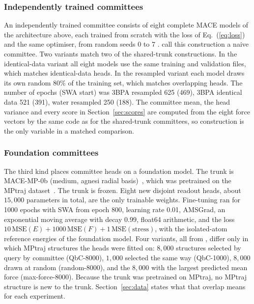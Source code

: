 \subsubsection{Independently trained committees}

An independently trained committee consists of eight complete MACE models of
the architecture above, each trained from scratch with the loss of
Eq.~(\ref{eq:loss}) and the same optimiser, from random seeds 0 to 7
\citep{krogh1995neural,lakshminarayanan2017simple}.
\citet{beck2025committee} call this construction a naive committee. Two
variants match two of the shared-trunk constructions. In the identical-data
variant all eight models use the same training and validation files, which
matches identical-data heads. In the resampled variant each model draws its
own random 80\% of the training set, which matches overlapping heads. The
number of epochs (SWA start) was 3BPA resampled 625 (469), 3BPA identical data
521 (391), water resampled 250 (188). The committee mean, the head variance and
every score in Section~\ref{sec:scores} are computed from the eight force
vectors by the same code as for the shared-trunk committees, so construction
is the only variable in a matched comparison.

\subsubsection{Foundation committees}

The third kind places committee heads on a foundation model. The trunk is
MACE-MP-0b (medium, agnesi radial basis)~\citep{batatia2023foundation}, which
was pretrained on the MPtraj dataset~\citep{deng2023chgnet}. The trunk is
frozen. Eight new disjoint readout heads, about $15{,}000$ parameters in
total, are the only trainable weights. Fine-tuning ran for 1000 epochs with SWA
from epoch 800, learning rate 0.01, AMSGrad, an exponential moving average with
decay 0.99, float64 arithmetic, and the loss
$10\,\mathrm{MSE}(E)+1000\,\mathrm{MSE}(F)+1\,\mathrm{MSE}(\text{stress})$,
with the isolated-atom reference energies of the foundation model. Four
variants, all from \citet{beck2025committee}, differ only in which MPtraj
structures the heads were fitted on: $8{,}000$ structures selected by
query by committee (QbC-8000), $1{,}000$ selected the same way (QbC-1000),
$8{,}000$ drawn at random (random-8000), and the $8{,}000$ with the largest
predicted mean force (max-force-8000). Because the trunk was pretrained on
MPtraj, no MPtraj structure is new to the trunk. Section~\ref{sec:data} states
what that overlap means for each experiment.

